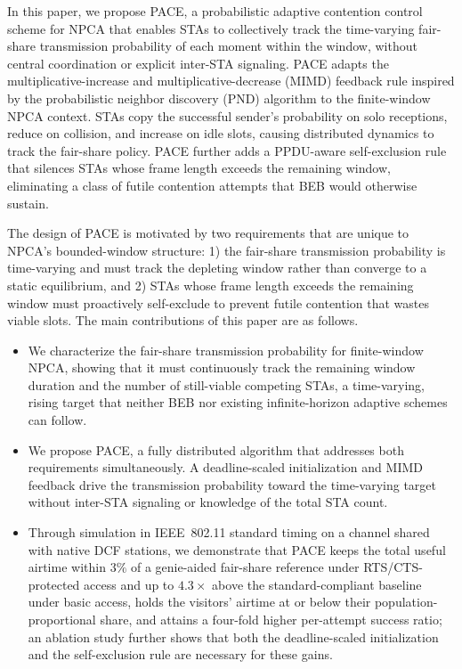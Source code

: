 \documentclass[conference]{IEEEtran}
\begin{document}
In this paper, we propose PACE, a probabilistic adaptive contention control scheme for NPCA that enables STAs to collectively track the time-varying fair-share transmission probability of each moment within the window, without central coordination or explicit inter-STA signaling. PACE adapts the multiplicative-increase and multiplicative-decrease (MIMD) feedback rule inspired by the probabilistic neighbor discovery (PND) algorithm \cite{song2014pnd} to the finite-window NPCA context. STAs copy the successful sender's probability on solo receptions, reduce on collision, and increase on idle slots, causing distributed dynamics to track the fair-share policy. PACE further adds a PPDU-aware self-exclusion rule that silences STAs whose frame length exceeds the remaining window, eliminating a class of futile contention attempts that BEB would otherwise sustain.

The design of PACE is motivated by two requirements that are unique to NPCA's bounded-window structure: 1) the fair-share transmission probability is time-varying and must track the depleting window rather than converge to a static equilibrium, and 2) STAs whose frame length exceeds the remaining window must proactively self-exclude to prevent futile contention that wastes viable slots. The main contributions of this paper are as follows.

\begin{itemize}
  \item We characterize the fair-share transmission probability for finite-window NPCA, showing that it must continuously track the remaining window duration and the number of still-viable competing STAs, a time-varying, rising target that neither BEB nor existing infinite-horizon adaptive schemes can follow.
  \item We propose PACE, a fully distributed algorithm that addresses both requirements simultaneously. A deadline-scaled initialization and MIMD feedback drive the transmission probability toward the time-varying target without inter-STA signaling or knowledge of the total STA count.
  \item Through simulation in IEEE~802.11 standard timing on a channel shared with native DCF stations, we demonstrate that PACE keeps the total useful airtime within $3\%$ of a genie-aided fair-share reference under RTS/CTS-protected access and up to $4.3\times$ above the standard-compliant baseline under basic access, holds the visitors' airtime at or below their population-proportional share, and attains a four-fold higher per-attempt success ratio; an ablation study further shows that both the deadline-scaled initialization and the self-exclusion rule are necessary for these gains.
\end{itemize}
\end{document}
